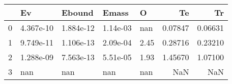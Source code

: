 \begin{tabular}{lllllrr}
\toprule
{} &         Ev &     Ebound &     Emass &     O &       Te &       Tr \\
\midrule
0 &  4.367e-10 &  1.884e-12 &  1.14e-03 &   nan &  0.07847 &  0.06631 \\
1 &  9.749e-11 &  1.106e-13 &  2.09e-04 &  2.45 &  0.28716 &  0.23210 \\
2 &  1.288e-09 &  7.563e-13 &  5.51e-05 &  1.93 &  1.45670 &  1.07100 \\
3 &        nan &        nan &       nan &   nan &      NaN &      NaN \\
\bottomrule
\end{tabular}
